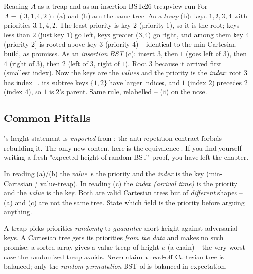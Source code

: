 \begin{example}{Reading $A$ as a treap and as an insertion BST}{c26-treapview-run}
For $A=(3,1,4,2)$: (a) and (b) are the same tree. As a \emph{treap} (b): keys $1,2,3,4$
with priorities $3,1,4,2$. The least priority is key $2$ (priority $1$), so it is the root; keys less
than $2$ (just key $1$) go left, keys greater ($3,4$) go right, and among them key $4$ (priority $2$) is
rooted above key $3$ (priority $4$) -- identical to the min-Cartesian build, as 
promises. As an \emph{insertion BST} (c): insert $3$, then $1$ (goes left of $3$), then $4$ (right of
$3$), then $2$ (left of $3$, right of $1$). Root $3$ because it arrived first (smallest index). Now the
keys are the \emph{values} and the priority is the \emph{index}: root $3$ has index $1$, its subtree keys
$\{1,2\}$ have larger indices, and $1$ (index $2$) precedes $2$ (index $4$), so $1$ is $2$'s parent. Same
rule, relabelled -- (ii) on the nose. \checkmark
\end{example}

\subsection{Common Pitfalls}\label{sec:c26-treapview-pitfalls}

\begin{warningbox}
's height statement is \emph{imported} from ; the anti-repetition
contract forbids rebuilding it. The only new content here is the equivalence .
If you find yourself writing a fresh "expected height of random BST" proof, you have left the chapter.
\end{warningbox}

\begin{warningbox}
In reading (a)/(b) the \emph{value} is the priority and the \emph{index} is the key (min-Cartesian /
value-treap). In reading (c) the \emph{index (arrival time)} is the priority and the \emph{value} is the
key. Both are valid Cartesian trees but of \emph{different} shapes -- (a) and (c) are not
the same tree. State which field is the priority before arguing anything.
\end{warningbox}

\begin{warningbox}
A treap picks priorities \emph{randomly} to \emph{guarantee} short height against adversarial keys. A
Cartesian tree gets its priorities \emph{from the data} and makes no such promise: a sorted array gives a
value-treap of height $n$ (a chain) -- the very worst case the randomised treap avoids. Never claim a
read-off Cartesian tree is balanced; only the \emph{random-permutation} BST of  is
balanced in expectation.
\end{warningbox}

